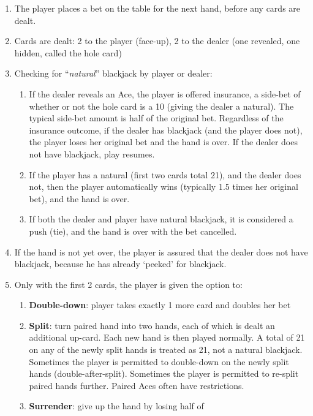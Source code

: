 \begin{enumerate}
\item The player places a bet on the table for the next hand, 
before any cards are dealt.
\item Cards are dealt: 2 to the player (face-up), 
2 to the dealer (one revealed, one hidden, called the hole card)
\item Checking for ``\emph{natural}'' blackjack by player or 
dealer:
\begin{enumerate}
\item If the dealer reveals an Ace, the player is offered 
insurance,
a side-bet of whether or not the hole card is a 10 
(giving the dealer a natural).
The typical side-bet amount is half of the original bet.
Regardless of the insurance outcome, 
if the dealer has blackjack (and the player does not),
the player loses her original bet and the hand is over.
If the dealer does not have blackjack, play resumes.  
\item If the player has a natural (first two cards total 21), 
and the dealer does not, then the player automatically wins
(typically 1.5 times her original bet), and the hand is over.
\item If both the dealer and player have natural blackjack, 
it is considered a push (tie), 
and the hand is over with the bet cancelled.  
\end{enumerate}
\item If the hand is not yet over, 
the player is assured that the dealer does not have blackjack, 
because he has already `peeked' for blackjack.
\item Only with the first 2 cards, the player is given the option to:
\begin{enumerate}
\item \textbf{Double-down}: player takes exactly 1 more card 
and doubles her bet
\item \textbf{Split}: turn paired hand into two hands, 
each of which is dealt an additional up-card.  
Each new hand is then played normally.
A total of 21 on any of the newly split hands is treated as 21, 
not a natural blackjack.
Sometimes the player is permitted to double-down on the newly 
split hands (double-after-split).
Sometimes the player is permitted to re-split paired hands further.
Paired Aces often have restrictions.  
\item \textbf{Surrender}: give up the hand by losing half of 

\end{enumerate}
\end{enumerate}
